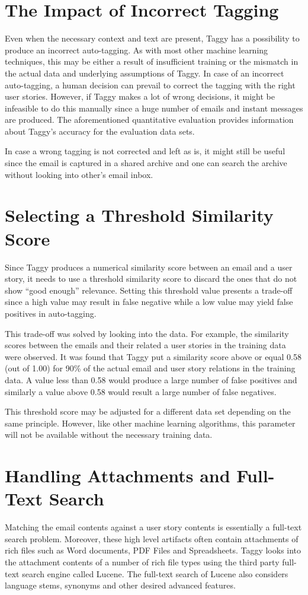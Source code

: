 \section{The Impact of Incorrect Tagging}
Even when the necessary context and text are present, Taggy has a possibility to produce an incorrect auto-tagging. As with most other machine learning techniques, this may be either a result of insufficient training or the mismatch in the actual data and underlying assumptions of Taggy. In case of an incorrect auto-tagging, a human decision can prevail to correct the tagging with the right user stories. However, if Taggy makes a lot of wrong decisions, it might be infeasible to do this manually since a huge number of emails and instant messages are produced. The aforementioned quantitative evaluation provides information about Taggy's accuracy for the evaluation data sets.

In case a wrong tagging is not corrected and left as is, it might still be useful since the email is captured in a shared archive and one can search the archive without looking into other's email inbox.

\section{Selecting a Threshold Similarity Score}
Since Taggy produces a numerical similarity score between an email and a user story, it needs to use a threshold similarity score to discard the ones that do not show ``good enough'' relevance. Setting this threshold value presents a trade-off since a high value may result in false negative while a low value may yield false positives in auto-tagging.

This trade-off was solved by looking into the data. For example, the similarity scores between the emails and their related a user stories in the training data were observed. It was found that Taggy put a similarity score above or equal 0.58 (out of 1.00) for 90\% of the actual email and user story relations in the training data. A value less than 0.58 would produce a large number of false positives and similarly a value above 0.58 would result a large number of false negatives.

This threshold score may be adjusted for a different data set depending on the same principle. However, like other machine learning algorithms, this parameter will not be available without the necessary training data.

\section{Handling Attachments and Full-Text Search}
Matching the email contents against a user story contents is essentially a full-text search problem. Moreover, these high level artifacts often contain attachments of rich files such as Word documents, PDF Files and Spreadsheets. Taggy looks into the attachment contents of a number of rich file types using the third party full-text search engine called Lucene. The full-text search of Lucene also considers language stems, synonyms and other desired advanced features.

